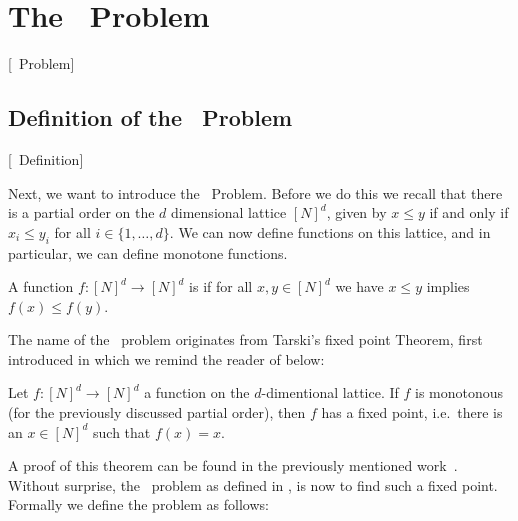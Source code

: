 \section{The \Tarski\ Problem}[\Tarski\ Problem]
\label{sec:tarski_problem}

\subsection{Definition of the \Tarski\ Problem}[\Tarski\ Definition]

Next, we want to introduce the \Tarski\ Problem. Before we do this we recall that there is a partial order on the $d$ dimensional lattice ${[N]}^d$, given by $x \leq y$ if and only if $x_i \leq y_i$ for all $i \in \{1, \dots, d\}$. We can now define functions on this lattice, and in particular, we can define monotone functions.

\begin{definition}
    A function $f : {[N]}^d \rightarrow {[N]}^d$ is  if for all $x, y \in {[N]}^d$ we have $x \leq y$ implies $f(x) \leq f(y)$.
\end{definition}

The name of the \Tarski\ problem originates from Tarski's fixed point Theorem, first introduced in  which we remind the reader of below:

\begin{theorem}
    Let $f : {[N]}^d \rightarrow {[N]}^d$ a function on the $d$-dimentional lattice. If $f$ is monotonous (for the previously discussed partial order), then $f$ has a fixed point, i.e.\ there is an $x \in {[N]}^d$ such that $f(x)=x$.
\end{theorem}

A proof of this theorem can be found in the previously mentioned work~\cite{tarski_lattice-theoretical_1955}. Without surprise, the \Tarski\ problem as defined in , is now to find such a fixed point. Formally we define the problem as follows:

